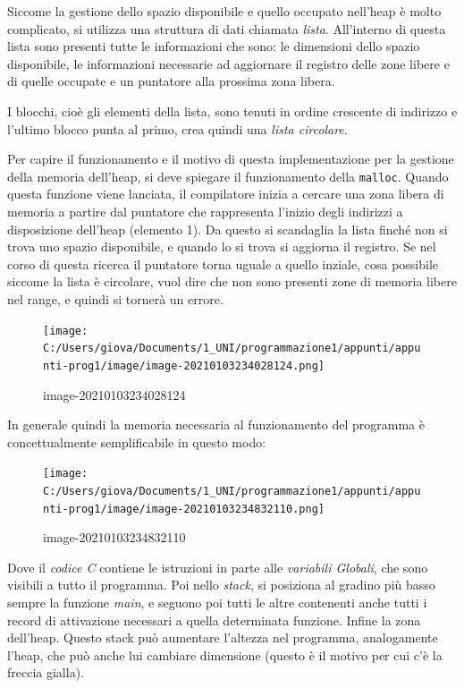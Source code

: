 \documentclass[
  paper=a4,
  oneside  ,captions=tableheading
]{scrbook}
\newcommand{\passthrough}[1]{#1}
\begin{document}
Siccome la gestione dello spazio disponibile e quello occupato nell'heap
è molto complicato, si utilizza una struttura di dati chiamata
\emph{lista}. All'interno di questa lista sono presenti tutte le
informazioni che sono: le dimensioni dello spazio disponibile, le
informazioni necessarie ad aggiornare il registro delle zone libere e di
quelle occupate e un puntatore alla prossima zona libera.

I blocchi, cioè gli elementi della lista, sono tenuti in ordine
crescente di indirizzo e l'ultimo blocco punta al primo, crea quindi una
\emph{lista circolare}.

Per capire il funzionamento e il motivo di questa implementazione per la
gestione della memoria dell'heap, si deve spiegare il funzionamento
della \passthrough{\lstinline!malloc!}. Quando questa funzione viene
lanciata, il compilatore inizia a cercare una zona libera di memoria a
partire dal puntatore che rappresenta l'inizio degli indirizzi a
disposizione dell'heap (elemento 1). Da questo si scandaglia la lista
finché non si trova uno spazio disponibile, e quando lo si trova si
aggiorna il registro. Se nel corso di questa ricerca il puntatore torna
uguale a quello inziale, cosa possibile siccome la lista è circolare,
vuol dire che non sono presenti zone di memoria libere nel range, e
quindi si tornerà un errore.

\begin{figure}
\centering
\texttt{[image: C:/Users/giova/Documents/1\_UNI/programmazione1/appunti/appunti-prog1/image/image-20210103234028124.png]}
\caption{image-20210103234028124}
\end{figure}

In generale quindi la memoria necessaria al funzionamento del programma
è concettualmente semplificabile in questo modo:

\begin{figure}
\centering
\texttt{[image: C:/Users/giova/Documents/1\_UNI/programmazione1/appunti/appunti-prog1/image/image-20210103234832110.png]}
\caption{image-20210103234832110}
\end{figure}

Dove il \emph{codice C} contiene le istruzioni in parte alle
\emph{variabili Globali}, che sono visibili a tutto il programma. Poi
nello \emph{stack}, si posiziona al gradino più basso sempre la funzione
\emph{main}, e seguono poi tutti le altre contenenti anche tutti i
record di attivazione necessari a quella determinata funzione. Infine la
zona dell'heap. Questo stack può aumentare l'altezza nel programma,
analogamente l'heap, che può anche lui cambiare dimensione (questo è il
motivo per cui c'è la freccia gialla).
\end{document}
